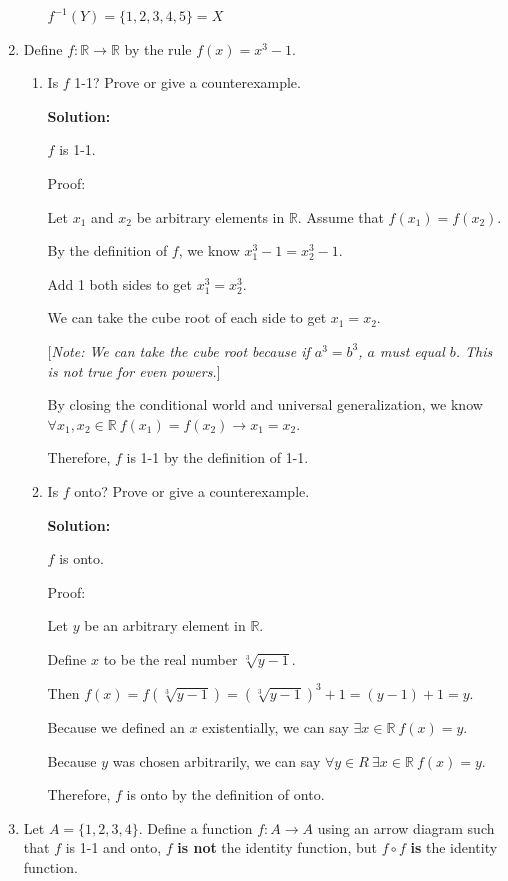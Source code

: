 \documentclass[11pt, letterpaper]{report}
\newcommand{\R}{\mathbb{R}}
\newcommand{\proofnote}[1]{[\textit{Note: #1}]}
\begin{document}
\begin{enumerate}
\begin{enumerate}
	$f^{-1}(Y) = \{1,2,3,4,5\} = X$
\end{enumerate}

\item Define $f : \R \to \R$ by the rule $f(x) = x^3-1$.  
\begin{enumerate}
\item Is $f$ 1-1?  Prove or give a counterexample.

\textbf{Solution:}

$f$ is 1-1.  

Proof:

Let $x_1$ and $x_2$ be arbitrary elements in $\R$.  Assume that $f(x_1) = f(x_2)$.

By the definition of $f$, we know $x_1^3-1 = x_2^3-1$.

Add 1 both sides to get $x_1^3 = x_2^3$.

We can take the cube root of each side to get $x_1=x_2$.

\proofnote{We can take the cube root because if $a^3=b^3$, $a$ must equal $b$.  This is
not true for even powers.}

By closing the conditional world and universal generalization, we know  \\
$\forall x_1,x_2 \in \R \ f(x_1) = f(x_2) \to x_1=x_2$.

Therefore, $f$ is 1-1 by the definition of 1-1.


\item Is $f$ onto?  Prove or give a counterexample.

\textbf{Solution:}

$f$ is onto.

Proof:

Let $y$ be an arbitrary element in $\R$.  

Define $x$ to be the real number $\sqrt[3]{y-1}$.

Then $f(x) = f(\sqrt[3]{y-1}) = (\sqrt[3]{y-1})^3 + 1 = (y-1)+1 = y.$

Because we defined an $x$ existentially, we can say $\exists x \in \R \ f(x)=y$.

Because $y$ was chosen arbitrarily, we can say $\forall y \in R \ \exists x \in \R \ f(x)=y$.

Therefore, $f$ is onto by the definition of onto.
\end{enumerate}



\item Let $A = \{1, 2, 3, 4\}$.  Define a function $f:A \to A$ using an arrow diagram such that
$f$ is 1-1 and onto, $f$ \textbf{is not} the identity function, but $f \circ f$ \textbf{is} the identity function.


\end{enumerate}
\end{document}
